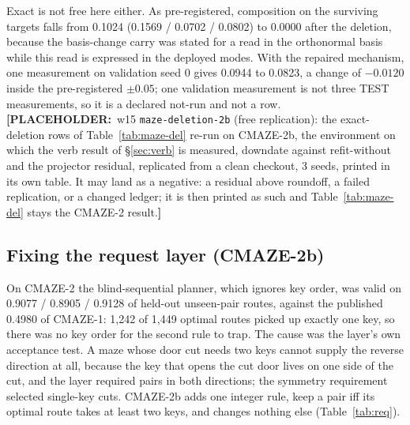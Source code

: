\documentclass{article} %
\newcommand{\PLACEHOLDER}[1]{{\color{red}\textbf{[PLACEHOLDER:}~#1\textbf{]}}}
\begin{document}
\noindent Exact is not free here either. As pre-registered, composition on the surviving
targets falls from 0.1024 (0.1569 / 0.0702 / 0.0802) to 0.0000 after the deletion, because the
basis-change carry was stated for a read in the orthonormal basis while this read is expressed
in the deployed modes. With the repaired mechanism, one measurement on validation seed 0 gives
0.0944 to 0.0823, a change of $-0.0120$ inside the pre-registered $\pm0.05$; one validation
measurement is not three TEST measurements, so it is a declared not-run and not a row.
\PLACEHOLDER{w15 \texttt{maze-deletion-2b} (free replication): the exact-deletion rows of
Table~\ref{tab:maze-del} re-run on CMAZE-2b, the environment on which the verb result of
\S\ref{sec:verb} is measured, downdate against refit-without and the projector residual,
replicated from a clean checkout, 3 seeds, printed in its own table. It may land as a
negative: a residual above roundoff, a failed replication, or a changed ledger; it is then
printed as such and Table~\ref{tab:maze-del} stays the CMAZE-2 result.}

\subsection{Fixing the request layer (CMAZE-2b)}
\label{sec:req-layer}

On CMAZE-2 the blind-sequential planner, which ignores key order, was valid on 0.9077 /
0.8905 / 0.9128 of held-out unseen-pair routes, against the published 0.4980 of CMAZE-1: 1,242
of 1,449 optimal routes picked up exactly one key, so there was no key order for the second rule
to trap. %
The cause was the layer's own acceptance test. A maze whose door cut needs two keys cannot
supply the reverse direction at all, because the key that opens the cut door lives on one side
of the cut, and the layer required pairs in both directions; the symmetry requirement selected
single-key cuts. %
CMAZE-2b adds one integer rule, keep a pair iff its optimal route takes at least two keys, and
changes nothing else (Table~\ref{tab:req}).
\end{document}
